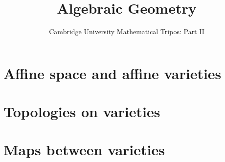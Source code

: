 \documentclass{article}
\title{Algebraic Geometry}
\author{Cambridge University Mathematical Tripos: Part II}
\begin{document}
\maketitle

\tableofcontentsnewpage{}


\section{Affine space and affine varieties}

\section{Topologies on varieties}

\section{Maps between varieties}

\end{document}
